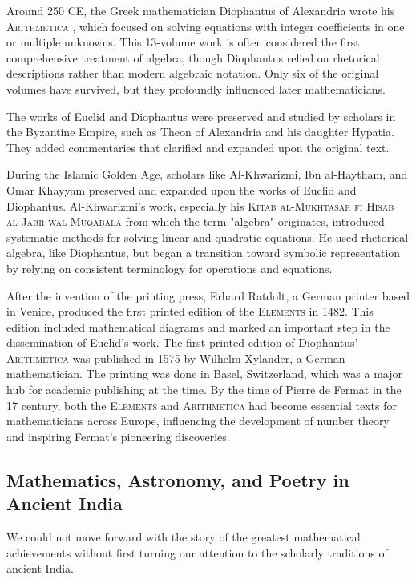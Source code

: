 Around 250 CE, the Greek mathematician Diophantus of Alexandria wrote his \textsc{Arithmetica} \cite{diophantus1910}, which focused on solving equations with integer coefficients in one or multiple unknowns. This 13-volume work is often considered the first comprehensive treatment of algebra, though Diophantus relied on rhetorical descriptions rather than modern algebraic notation. Only six of the original volumes have survived, but they profoundly influenced later mathematicians.

The works of Euclid and Diophantus were preserved and studied by scholars in the Byzantine Empire, such as Theon of Alexandria and his daughter Hypatia. They added commentaries that clarified and expanded upon the original text.

During the Islamic Golden Age, scholars like Al-Khwarizmi, Ibn al-Haytham, and Omar Khayyam preserved and expanded upon the works of Euclid and Diophantus. Al-Khwarizmi's work, especially his \textsc{Kitab al-Mukhtasar fi Hisab al-Jabr wal-Muqabala} from which the term "algebra" originates, introduced systematic methods for solving linear and quadratic equations. He used rhetorical algebra, like Diophantus, but began a transition toward symbolic representation by relying on consistent terminology for operations and equations.

After the invention of the printing press, Erhard Ratdolt, a German printer based in Venice, produced the first printed edition of the \textsc{Elements} in 1482. This edition included mathematical diagrams and marked an important step in the dissemination of Euclid's work. The first printed edition of Diophantus' \textsc{Arithmetica} was published in 1575 by Wilhelm Xylander, a German mathematician. The printing was done in Basel, Switzerland, which was a major hub for academic publishing at the time. By the time of Pierre de Fermat in the 17\supth{} century, both the \textsc{Elements} and \textsc{Arithmetica} had become essential texts for mathematicians across Europe, influencing the development of number theory and inspiring Fermat’s pioneering discoveries.

\subsection{Mathematics, Astronomy, and Poetry in Ancient India}

We could not move forward with the story of the greatest mathematical achievements without first turning our attention to the scholarly traditions of ancient India.

